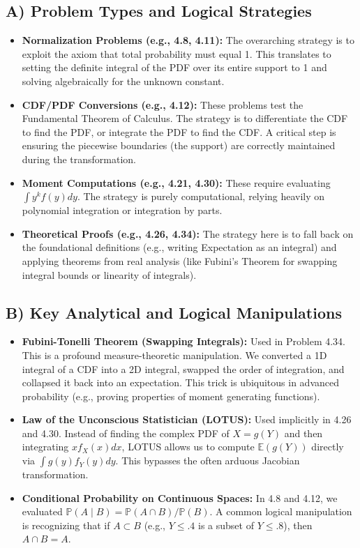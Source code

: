 \documentclass[11pt, a4paper]{article}
\theoremstyle{definition}
\theoremstyle{remark}
\newcommand{\E}{\mathbb{E}}
\newcommand{\Prob}{\mathbb{P}}
\begin{document}
\subsection{A) Problem Types and Logical Strategies}
\begin{itemize}
    \item \textbf{Normalization Problems (e.g., 4.8, 4.11):} The overarching strategy is to exploit the axiom that total probability must equal 1. This translates to setting the definite integral of the PDF over its entire support to 1 and solving algebraically for the unknown constant.
    \item \textbf{CDF/PDF Conversions (e.g., 4.12):} These problems test the Fundamental Theorem of Calculus. The strategy is to differentiate the CDF to find the PDF, or integrate the PDF to find the CDF. A critical step is ensuring the piecewise boundaries (the support) are correctly maintained during the transformation.
    \item \textbf{Moment Computations (e.g., 4.21, 4.30):} These require evaluating $\int y^k f(y) dy$. The strategy is purely computational, relying heavily on polynomial integration or integration by parts. 
    \item \textbf{Theoretical Proofs (e.g., 4.26, 4.34):} The strategy here is to fall back on the foundational definitions (e.g., writing Expectation as an integral) and applying theorems from real analysis (like Fubini's Theorem for swapping integral bounds or linearity of integrals).
\end{itemize}

\subsection{B) Key Analytical and Logical Manipulations}
\begin{itemize}
    \item \textbf{Fubini-Tonelli Theorem (Swapping Integrals):} Used in Problem 4.34. This is a profound measure-theoretic manipulation. We converted a 1D integral of a CDF into a 2D integral, swapped the order of integration, and collapsed it back into an expectation. This trick is ubiquitous in advanced probability (e.g., proving properties of moment generating functions).
    \item \textbf{Law of the Unconscious Statistician (LOTUS):} Used implicitly in 4.26 and 4.30. Instead of finding the complex PDF of $X = g(Y)$ and then integrating $x f_X(x) dx$, LOTUS allows us to compute $\E(g(Y))$ directly via $\int g(y) f_Y(y) dy$. This bypasses the often arduous Jacobian transformation.
    \item \textbf{Conditional Probability on Continuous Spaces:} In 4.8 and 4.12, we evaluated $\Prob(A \mid B) = \Prob(A \cap B) / \Prob(B)$. A common logical manipulation is recognizing that if $A \subset B$ (e.g., $Y \le .4$ is a subset of $Y \le .8$), then $A \cap B = A$.
\end{itemize}
\end{document}
